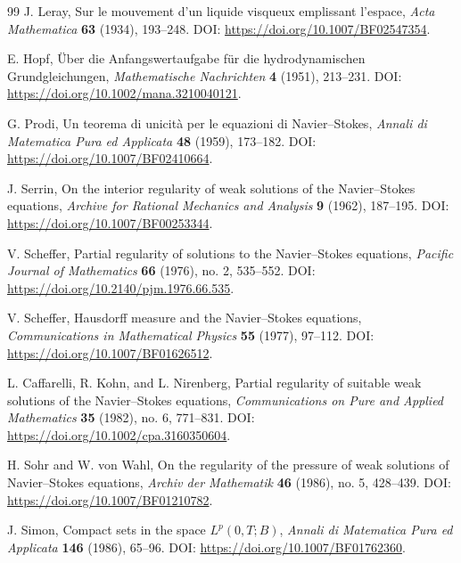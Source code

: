 \documentclass[11pt]{article}
\numberwithin{equation}{section}
\theoremstyle{plain}
\theoremstyle{definition}
\theoremstyle{remark}
\begin{document}
\begin{thebibliography}{99}
	J. Leray,
	Sur le mouvement d'un liquide visqueux emplissant l'espace,
	\newblock \emph{Acta Mathematica} \textbf{63} (1934), 193--248.
	\newblock DOI: \url{https://doi.org/10.1007/BF02547354}.

	E. Hopf,
	\"Uber die Anfangswertaufgabe f\"ur die hydrodynamischen Grundgleichungen,
	\newblock \emph{Mathematische Nachrichten} \textbf{4} (1951), 213--231.
	\newblock DOI: \url{https://doi.org/10.1002/mana.3210040121}.

	G. Prodi,
	Un teorema di unicit\`a per le equazioni di Navier--Stokes,
	\newblock \emph{Annali di Matematica Pura ed Applicata} \textbf{48} (1959), 173--182.
	\newblock DOI: \url{https://doi.org/10.1007/BF02410664}.

	J. Serrin,
	On the interior regularity of weak solutions of the Navier--Stokes equations,
	\newblock \emph{Archive for Rational Mechanics and Analysis} \textbf{9} (1962), 187--195.
	\newblock DOI: \url{https://doi.org/10.1007/BF00253344}.

	V. Scheffer,
	Partial regularity of solutions to the Navier--Stokes equations,
	\newblock \emph{Pacific Journal of Mathematics} \textbf{66} (1976), no. 2, 535--552.
	\newblock DOI: \url{https://doi.org/10.2140/pjm.1976.66.535}.

	V. Scheffer,
	Hausdorff measure and the Navier--Stokes equations,
	\newblock \emph{Communications in Mathematical Physics} \textbf{55} (1977), 97--112.
	\newblock DOI: \url{https://doi.org/10.1007/BF01626512}.

	L. Caffarelli, R. Kohn, and L. Nirenberg,
	Partial regularity of suitable weak solutions of the Navier--Stokes equations,
	\newblock \emph{Communications on Pure and Applied Mathematics} \textbf{35} (1982), no. 6, 771--831.
	\newblock DOI: \url{https://doi.org/10.1002/cpa.3160350604}.

	H. Sohr and W. von Wahl,
	On the regularity of the pressure of weak solutions of Navier--Stokes equations,
	\newblock \emph{Archiv der Mathematik} \textbf{46} (1986), no. 5, 428--439.
	\newblock DOI: \url{https://doi.org/10.1007/BF01210782}.

	J. Simon,
	Compact sets in the space $L^p(0,T;B)$,
	\newblock \emph{Annali di Matematica Pura ed Applicata} \textbf{146} (1986), 65--96.
	\newblock DOI: \url{https://doi.org/10.1007/BF01762360}.


\end{thebibliography}
\end{document}
